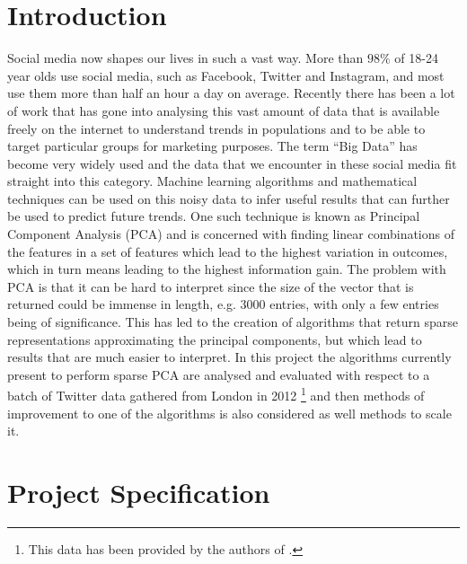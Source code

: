 \documentclass[11pt,a4paper]{article}
\begin{document}
\section{Introduction}
Social media now shapes our lives in such a vast way. More than $98\%$ of 18-24 year olds use social media, such as Facebook, Twitter and Instagram, and most use them more than half an hour a day on average\cite{statbrain}. Recently there has been a lot of work that has gone into analysing this vast amount of data that is available freely on the internet to understand trends in populations and to be able to target particular groups for marketing purposes. The term ``Big Data'' has become very widely used and the data that we encounter in these social media fit straight into this category. Machine learning algorithms and mathematical techniques can be used on this noisy data to infer useful results that can further be used to predict future trends. 
One such technique is known as Principal Component Analysis (PCA) and is concerned with finding linear combinations of the features in a set of features which lead to the highest variation in outcomes, which in turn means leading to the highest information gain. The problem with PCA is that it can be hard to interpret since the size of the vector that is returned could be immense in length, e.g. 3000 entries, with only a few entries being of significance. This has led to the creation of algorithms that return sparse representations approximating the principal components, but which lead to results that are much easier to interpret. In this project the algorithms currently present to perform sparse PCA are analysed and evaluated with respect to a batch of Twitter data gathered from London in 2012 \footnote{This data has been provided by the authors of \cite{microblogs}.} and then methods of improvement to one of the algorithms is also considered as well methods to scale it. 


\section{Project Specification}
\end{document}
